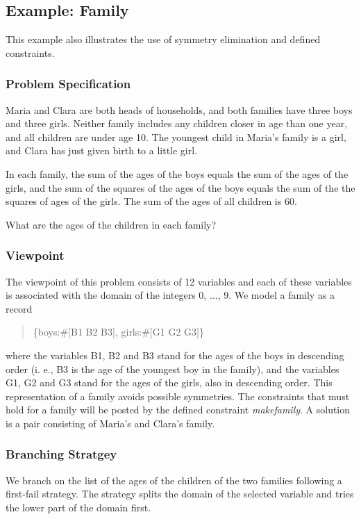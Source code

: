\documentclass[a4paper]{scrartcl}
\begin{document}
\newpage
\subsection{Example: Family}
This example also illustrates the use of symmetry elimination and
defined constraints.

\subsubsection{Problem Specification}
Maria and Clara are both heads of households, and both families 
have three boys and three girls. Neither family includes any children closer 
in age than one year, and all children are under age 10. The youngest child 
in Maria's family is a girl, and Clara has just given birth to a little girl.
\par
In each family, the sum of the ages of the boys equals the sum of the ages 
of the girls, and the sum of the squares of the ages of the boys equals the 
sum of the the squares of ages of the girls. The sum of the ages of all children 
is 60.
\par
What are the ages of the children in each family? 

\subsubsection{Viewpoint}
The viewpoint of this problem consists of 12 variables
and each of these variables is associated with the domain of the integers
0, $\ldots$, 9. 
We model a family as a record
\begin{quote}
\{boys:$ \#[ $B1 B2 B3$]$, girls:$\#[$G1 G2 G3$]$\}
\end{quote}
where the variables B1, B2 and B3 stand for the ages of the boys in descending 
order (i. e., B3 is the age of the youngest boy in the family), and the variables 
G1, G2 and G3 stand for the ages of the girls, also in descending order. This 
representation of a family avoids possible symmetries. The constraints that must 
hold for a family will be posted by the defined constraint {\it makefamily}.
A solution is a pair consisting of Maria's and Clara's family. 

\subsubsection{Branching Stratgey}
We branch on the list of the ages of the children of the two families following 
a first-fail strategy. The strategy splits the domain of the selected variable and 
tries the lower part of the domain first.
\end{document}
